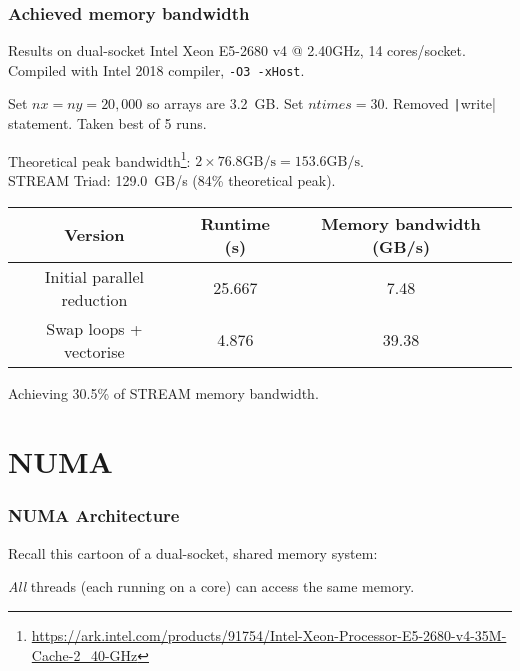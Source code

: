 \documentclass{beamer}
\begin{document}
\begin{frame}
\frametitle{Achieved memory bandwidth}

Results on dual-socket Intel Xeon E5-2680 v4 @ 2.40GHz, 14 cores/socket.
Compiled with Intel 2018 compiler, {\tt -O3 -xHost}.

\vfill

Set $nx=ny=20,000$ so arrays are 3.2~GB. Set $ntimes=30$. Removed \texttt|write| statement. Taken best of 5 runs.

\vfill

\pause
Theoretical peak bandwidth\footnote{\url{https://ark.intel.com/products/91754/Intel-Xeon-Processor-E5-2680-v4-35M-Cache-2_40-GHz}}: $2 \times 76.8 \text{GB/s} = 153.6 \text{GB/s}$. \\
STREAM Triad: 129.0~GB/s (84\% theoretical peak).

\pause
\begin{table}
\begin{tabular}{ccc}
\toprule
Version & Runtime (s) & Memory bandwidth (GB/s)\\
\midrule
Initial parallel reduction & 25.667 &  7.48 \\
Swap loops + vectorise     &  4.876 & 39.38 \\
\bottomrule
\end{tabular}
\end{table}

Achieving 30.5\% of STREAM memory bandwidth.

\end{frame}

\section{NUMA}
\begin{frame}
\frametitle{NUMA Architecture}

Recall this cartoon of a dual-socket, shared memory system:
\begin{center}
\end{center}

\emph{All} threads (each running on a core) can access the same memory.

\end{frame}
\end{document}
